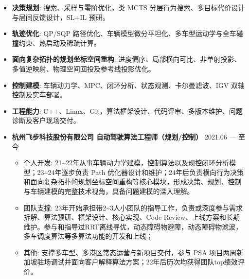 \documentclass[zh]{resume}
\begin{document}
\makeheader

\begin{abstract}
5 年 L4 港口物流自动驾驶算法研发经验，主导横向行为决策、实时路径优化及面向复杂拓扑的规划坐标空间重构等核心模块。具备从决策、规划、控制到车辆建模与现场交付的跨层能力。相关方案覆盖集卡、IGV、物流小车等多车型，落地国内外港口及城市物流场景。
\end{abstract}

\begin{itemize}
  \item \textbf{决策规划}: 搜索、采样与零阶优化，类 MCTS 分层行为搜索、多目标代价设计与层间反馈设计，SL+IL 预研。
  \item \textbf{轨迹优化}: QP/SQP 路径优化、车辆模型微分平坦化、多车型运动学与全车碰撞约束、热启动及稀疏计算。
  \item \textbf{面向复杂拓扑的规划坐标空间重构}: 进度偏序、局部横向可比、非单射投影、多值逆映射、物理空间回投及参考线投影优化。
  \item \textbf{控制建模}: 车辆动力学、MPC、闭环分析、状态观测、卡尔曼滤波、IGV 双轴控制及实车部署。
  \item \textbf{工程能力}: C++、Linux、Git，算法框架设计、代码评审、多版本维护、问题诊断及客户现场交付。
\end{itemize}

\begin{itemize}
  \item \textbf{杭州飞步科技股份有限公司 \quad 自动驾驶算法工程师（规划/控制）} \hfill 2021.06 --- 至今
  \begin{itemize}
    \item 个人开发: 21\textasciitilde{}22年从事车辆动力学建模，控制算法以及规控闭环分析模型；23\textasciitilde{}24年逐步负责 Path 优化器设计和维护；24年后负责横向行为决策和面向复杂拓扑的规划坐标空间重构等核心模块，形成决策、规划、控制与车辆建模的完整技术视角，具备问题建模的深入理解。
    \item 团队支撑: 23年开始承担带2\textasciitilde{}3人小团队的指导工作，负责或深度参与需求拆解、算法预研、框架设计、核心实现、Code Review、上线方案和长期维护。参与和指导过RRT离线寻优，动态障碍物避障，动态障碍物滤波，多车调度算法等多算法功能的开发和上线；
    \item 其他: 支撑多车型、多港区常态运营与新项目交付，参与 PSA 项目两周新加坡驻场调试并面向客户解释算法方案；22年后历次均获得团队top绩效评价。
  \end{itemize}
\end{itemize}
\end{document}

